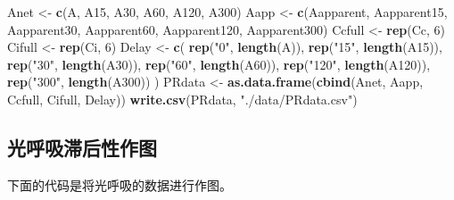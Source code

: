 \documentclass[
]{krantz}
\makeatletter
\newenvironment{Shaded}{\begin{snugshade}}{\end{snugshade}}
\newcommand{\DecValTok}[1]{\textcolor[rgb]{0.00,0.00,0.81}{#1}}
\newcommand{\KeywordTok}[1]{\textcolor[rgb]{0.13,0.29,0.53}{\textbf{#1}}}
\newcommand{\NormalTok}[1]{#1}
\newcommand{\StringTok}[1]{\textcolor[rgb]{0.31,0.60,0.02}{#1}}
\newenvironment{kframe}{%
\medskip{}
\setlength{\fboxsep}{.8em}
 \def\at@end@of@kframe{}%
 \ifinner\ifhmode%
  \def\at@end@of@kframe{\end{minipage}}%
  \begin{minipage}{\columnwidth}%
 \fi\fi%
 \def\FrameCommand##1{\hskip\@totalleftmargin \hskip-\fboxsep
 \colorbox{shadecolor}{##1}\hskip-\fboxsep
     \hskip-\linewidth \hskip-\@totalleftmargin \hskip\columnwidth}%
 \MakeFramed {\advance\hsize-\width
   \@totalleftmargin\z@ \linewidth\hsize
   \@setminipage}}%
 {\par\unskip\endMakeFramed%
 \at@end@of@kframe}
\renewenvironment{Shaded}{\begin{kframe}}{\end{kframe}}
\makeatother
\begin{document}
\begin{Shaded}
\begin{Highlighting}[]
\NormalTok{Anet <-}\StringTok{ }\KeywordTok{c}\NormalTok{(A, A15, A30, A60, A120, A300)}
\NormalTok{Aapp <-}
\StringTok{  }\KeywordTok{c}\NormalTok{(Aapparent,}
\NormalTok{    Aapparent15,}
\NormalTok{    Aapparent30,}
\NormalTok{    Aapparent60,}
\NormalTok{    Aapparent120,}
\NormalTok{    Aapparent300)}
\NormalTok{Ccfull <-}\StringTok{ }\KeywordTok{rep}\NormalTok{(Cc, }\DecValTok{6}\NormalTok{)}
\NormalTok{Cifull <-}\StringTok{ }\KeywordTok{rep}\NormalTok{(Ci, }\DecValTok{6}\NormalTok{)}
\NormalTok{Delay <-}
\StringTok{  }\KeywordTok{c}\NormalTok{(}
    \KeywordTok{rep}\NormalTok{(}\StringTok{"0"}\NormalTok{, }\KeywordTok{length}\NormalTok{(A)),}
    \KeywordTok{rep}\NormalTok{(}\StringTok{"15"}\NormalTok{, }\KeywordTok{length}\NormalTok{(A15)),}
    \KeywordTok{rep}\NormalTok{(}\StringTok{"30"}\NormalTok{, }\KeywordTok{length}\NormalTok{(A30)),}
    \KeywordTok{rep}\NormalTok{(}\StringTok{"60"}\NormalTok{, }\KeywordTok{length}\NormalTok{(A60)),}
    \KeywordTok{rep}\NormalTok{(}\StringTok{"120"}\NormalTok{, }\KeywordTok{length}\NormalTok{(A120)),}
    \KeywordTok{rep}\NormalTok{(}\StringTok{"300"}\NormalTok{, }\KeywordTok{length}\NormalTok{(A300))}
\NormalTok{  )}
\NormalTok{PRdata <-}\StringTok{ }\KeywordTok{as.data.frame}\NormalTok{(}\KeywordTok{cbind}\NormalTok{(Anet, Aapp, Ccfull, Cifull, Delay))}
\KeywordTok{write.csv}\NormalTok{(PRdata, }\StringTok{"./data/PRdata.csv"}\NormalTok{)}
\end{Highlighting}
\end{Shaded}

\hypertarget{photo-resp-graph}{%
\subsection{光呼吸滞后性作图}\label{photo-resp-graph}}

下面的代码是将光呼吸的数据进行作图。
\end{document}

